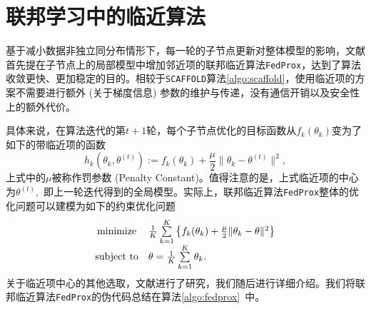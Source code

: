 \section{联邦学习中的临近算法}
\label{sec:chap2-ppa}


基于减小数据非独立同分布情形下，每一轮的子节点更新对整体模型的影响，文献\parencite{sahu2018fedprox}首先提在子节点上的局部模型中增加邻近项的联邦临近算法\texttt{FedProx}，达到了算法收敛更快、更加稳定的目的。相较于\texttt{SCAFFOLD}算法\ref{algo:scaffold}，使用临近项的方案不需要进行额外 (关于梯度信息) 参数的维护与传递，没有通信开销以及安全性上的额外代价。

具体来说，在算法迭代的第$t+1$轮，每个子节点优化的目标函数从$f_k(\theta_k)$变为了如下的带临近项的函数
\begin{equation}
\label{eq:fedprox}
h_k(\theta_k, \theta^{(t)}) := f_k(\theta_k) + \frac{\mu}{2} \lVert \theta_k - \theta^{(t)} \rVert^2,
\end{equation}
上式中的$\mu$被称作罚参数 (Penalty Constant)。值得注意的是，上式临近项的中心为$\theta^{(t)},$ 即上一轮迭代得到的全局模型。实际上，联邦临近算法\texttt{FedProx}整体的优化问题可以建模为如下的约束优化问题
\begin{equation}
\label{eq:fedprox-whole}
\begin{array}{cl}
\operatorname*{minimize} & \frac{1}{K} \sum\limits_{k=1}^K \left\{ f_k(\theta_k) + \frac{\mu}{2} \lVert \theta_k - \theta \rVert^2 \right\} \\
\text{subject to} & \theta = \frac{1}{K} \sum\limits_{k=1}^K \theta_k.
\end{array}
\end{equation}
关于临近项中心的其他选取，文献\parencite{hanzely2020federated,li_2021_ditto}进行了研究，我们随后进行详细介绍。我们将联邦临近算法\texttt{FedProx}的伪代码总结在算法\ref{algo:fedprox}~中。




